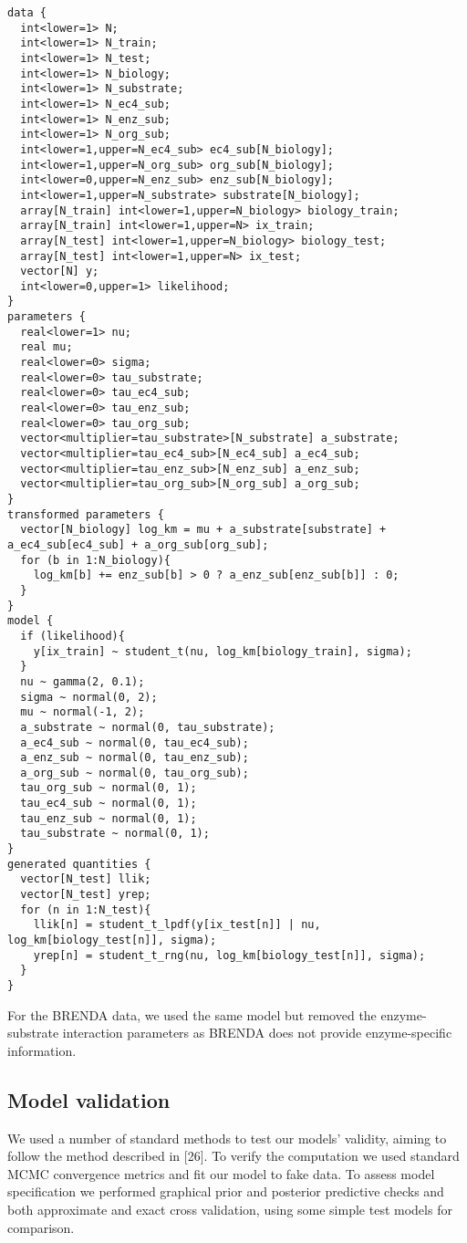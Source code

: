 \documentclass[11pt]{article}
\makeatletter
\newcommand{\citeprocitem}[2]{\hyper@linkstart{cite}{citeproc_bib_item_#1}#2\hyper@linkend}
\makeatother
\begin{document}
\begin{verbatim}
data {
  int<lower=1> N;
  int<lower=1> N_train;
  int<lower=1> N_test;
  int<lower=1> N_biology;
  int<lower=1> N_substrate;
  int<lower=1> N_ec4_sub;
  int<lower=1> N_enz_sub;
  int<lower=1> N_org_sub;
  int<lower=1,upper=N_ec4_sub> ec4_sub[N_biology];
  int<lower=1,upper=N_org_sub> org_sub[N_biology];
  int<lower=0,upper=N_enz_sub> enz_sub[N_biology];
  int<lower=1,upper=N_substrate> substrate[N_biology];
  array[N_train] int<lower=1,upper=N_biology> biology_train;
  array[N_train] int<lower=1,upper=N> ix_train;
  array[N_test] int<lower=1,upper=N_biology> biology_test;
  array[N_test] int<lower=1,upper=N> ix_test;
  vector[N] y;
  int<lower=0,upper=1> likelihood;
}
parameters {
  real<lower=1> nu;
  real mu;
  real<lower=0> sigma;
  real<lower=0> tau_substrate;
  real<lower=0> tau_ec4_sub;
  real<lower=0> tau_enz_sub;
  real<lower=0> tau_org_sub;
  vector<multiplier=tau_substrate>[N_substrate] a_substrate;
  vector<multiplier=tau_ec4_sub>[N_ec4_sub] a_ec4_sub;
  vector<multiplier=tau_enz_sub>[N_enz_sub] a_enz_sub;
  vector<multiplier=tau_org_sub>[N_org_sub] a_org_sub;
}
transformed parameters {
  vector[N_biology] log_km = mu + a_substrate[substrate] + a_ec4_sub[ec4_sub] + a_org_sub[org_sub];
  for (b in 1:N_biology){
    log_km[b] += enz_sub[b] > 0 ? a_enz_sub[enz_sub[b]] : 0;
  }
}
model {
  if (likelihood){
    y[ix_train] ~ student_t(nu, log_km[biology_train], sigma);
  }
  nu ~ gamma(2, 0.1);
  sigma ~ normal(0, 2);
  mu ~ normal(-1, 2);
  a_substrate ~ normal(0, tau_substrate);
  a_ec4_sub ~ normal(0, tau_ec4_sub);
  a_enz_sub ~ normal(0, tau_enz_sub);
  a_org_sub ~ normal(0, tau_org_sub);
  tau_org_sub ~ normal(0, 1);
  tau_ec4_sub ~ normal(0, 1);
  tau_enz_sub ~ normal(0, 1);
  tau_substrate ~ normal(0, 1);
}
generated quantities {
  vector[N_test] llik;
  vector[N_test] yrep;
  for (n in 1:N_test){
    llik[n] = student_t_lpdf(y[ix_test[n]] | nu, log_km[biology_test[n]], sigma);
    yrep[n] = student_t_rng(nu, log_km[biology_test[n]], sigma);
  }
}
\end{verbatim}

For the BRENDA data, we used the same model but removed the enzyme-substrate
interaction parameters as BRENDA does not provide enzyme-specific information.

\subsection{Model validation}
\label{sec:org9deef6f}
We used a number of standard methods to test our models' validity, aiming to
follow the method described in \citeprocitem{26}{[26]}. To verify the
computation we used standard MCMC convergence metrics and fit our model to fake
data. To assess model specification we performed graphical prior and posterior
predictive checks and both approximate and exact cross validation, using some
simple test models for comparison.
\end{document}
